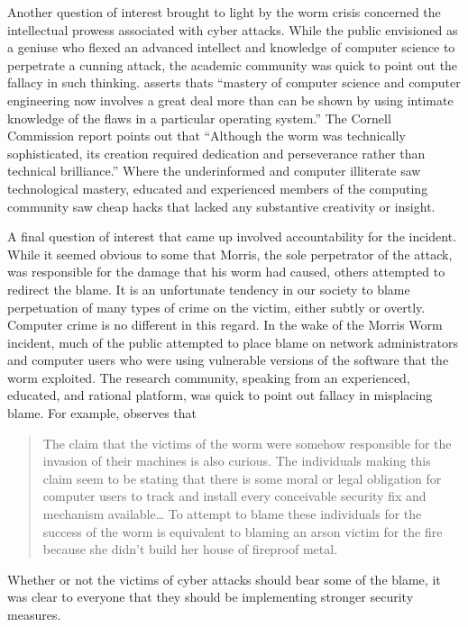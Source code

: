 Another question of interest brought to light by the worm crisis concerned the
intellectual prowess associated with cyber attacks. While the public 
envisioned as a geniuse who flexed an advanced intellect and
knowledge of computer science to perpetrate a cunning attack, the
academic community was quick to point out the fallacy in such thinking.
\cite{spafford_crisis_1989} asserts thats ``mastery of computer science and
computer engineering now involves a great deal more than can be shown by using
intimate knowledge of the flaws in a particular operating system.'' The Cornell
Commission report points out that ``Although the worm was technically
sophisticated, its creation required dedication and perseverance rather than
technical brilliance.'' Where the underinformed and computer
illiterate saw technological mastery, educated and experienced members of the
computing community saw cheap hacks that lacked any substantive creativity or
insight.

A final question of interest that came up involved accountability for the
incident. While it seemed obvious to some that Morris, the sole perpetrator of
the attack, was responsible for the damage that his worm had caused, others
attempted to redirect the blame. It is an unfortunate tendency in our society to
blame perpetuation of many types of crime on the victim, either subtly or
overtly. Computer crime is no different in this regard. In the wake of the
Morris Worm incident, much of the public attempted to place blame on network
administrators and computer users who were using vulnerable versions of the
software that the worm exploited. The research
community, speaking from an experienced, educated, and
rational platform, was quick to point out fallacy in misplacing blame.
For example, \cite{spafford_crisis_1989} observes that
\begin{quote}
The claim that the victims of the worm were somehow responsible for the
invasion of their machines is also curious. The individuals making this claim
seem to be stating that there is some moral or legal obligation for computer
users to track and install every conceivable security fix and mechanism
available\ldots
To attempt to blame these individuals for the success of the worm is equivalent
to blaming an arson victim for the fire because she didn't build her house of
fireproof metal.
\end{quote}
Whether or not the victims of cyber attacks should bear some of the blame, it
was clear to everyone that they should be implementing stronger security
measures.

